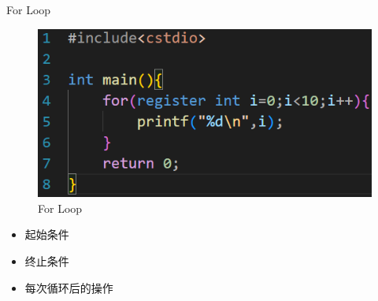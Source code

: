 \documentclass{beamer}
\begin{document}
\begin{frame}{For Loop}
    \begin{minipage}{0.45\linewidth}
        \begin{figure}
        \centering
        \includegraphics[width=\linewidth]{pic/For Loop.png}
        \caption{For Loop}
        \label{fig:For_Loop}
    \end{figure}
    \end{minipage}
    \hspace{1cm}
    \begin{minipage}{0.37\linewidth}
        \begin{itemize}
            \item 起始条件
            \item 终止条件
            \item 每次循环后的操作
        \end{itemize}
    \end{minipage}
\end{frame}
\end{document}
